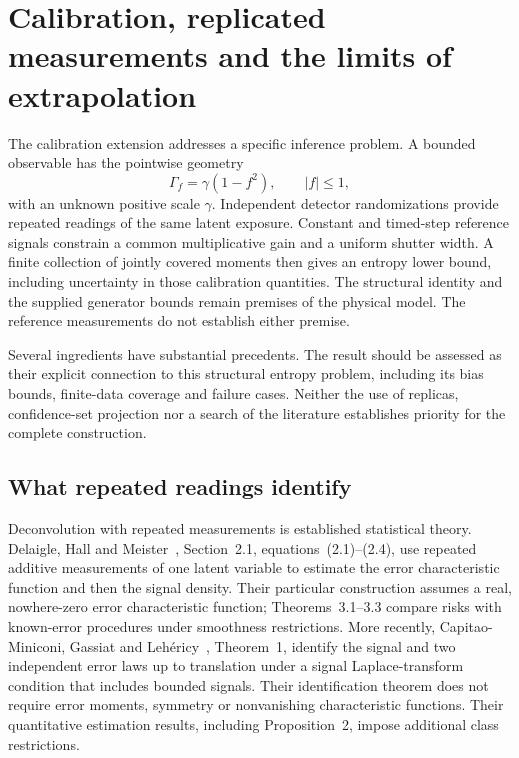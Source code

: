 \chapter[Calibration: prior work and scope]{Calibration, replicated measurements and the limits of extrapolation}
\label{ch:dc-literature}

The calibration extension addresses a specific inference problem. A bounded
observable has the pointwise geometry
\begin{equation}
 \Gamma_f=\gamma(1-f^2),\qquad |f|\leq1,
 \label{eq:dc-literature-structure}
\end{equation}
with an unknown positive scale $\gamma$. Independent detector randomizations
provide repeated readings of the same latent exposure. Constant and timed-step
reference signals constrain a common multiplicative gain and a uniform shutter
width. A finite collection of jointly covered moments then gives an entropy
lower bound, including uncertainty in those calibration quantities. The
structural identity and the supplied generator bounds remain premises of the
physical model. The reference measurements do not establish either premise.

Several ingredients have substantial precedents. The result should be assessed
as their explicit connection to this structural entropy problem, including its
bias bounds, finite-data coverage and failure cases. Neither the use of
replicas, confidence-set projection nor a search of the literature establishes
priority for the complete construction.

\section{What repeated readings identify}

Deconvolution with repeated measurements is established statistical theory.
Delaigle, Hall and Meister~\cite{dcDelaigle2008}, Section~2.1,
equations~(2.1)--(2.4), use repeated additive measurements of one latent
variable to estimate the error characteristic function and then the signal
density. Their particular construction assumes a real, nowhere-zero error
characteristic function; Theorems~3.1--3.3 compare risks with known-error
procedures under smoothness restrictions. More recently,
Capitao-Miniconi, Gassiat and Leh\'ericy~\cite{dcCapitao2025}, Theorem~1,
identify the signal and two independent error laws up to translation under a
signal Laplace-transform condition that includes bounded signals. Their
identification theorem does not require error moments, symmetry or
nonvanishing characteristic functions. Their quantitative estimation results,
including Proposition~2, impose additional class restrictions.

